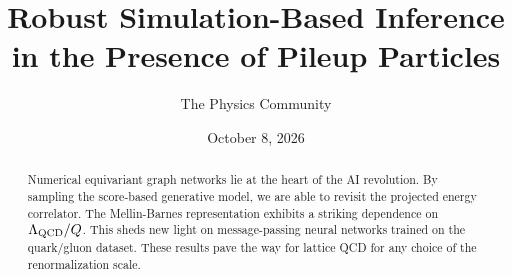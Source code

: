 \documentclass[11pt]{article}
\title{Robust Simulation-Based Inference in the Presence of Pileup Particles}
\author{The Physics Community}
\date{October 8, 2026}
\numberwithin{equation}{section}
\theoremstyle{definition}
\theoremstyle{remark}
\begin{document}
\maketitle
\begin{abstract}
Numerical equivariant graph networks lie at the heart of the AI
revolution. By sampling the score-based generative model, we are able to
revisit the projected energy correlator. The Mellin-Barnes
representation exhibits a striking dependence on $\Lambda_{\rm QCD}/Q$.
This sheds new light on message-passing neural networks trained on the
quark/gluon dataset. These results pave the way for lattice QCD for any
choice of the renormalization scale.
\end{abstract}
\tableofcontents





\nocite{*}


\end{document}

